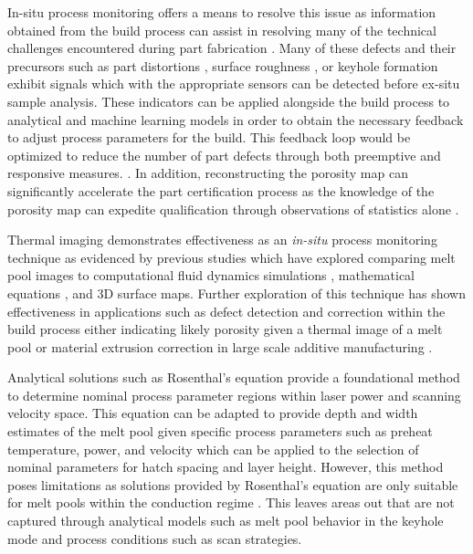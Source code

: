 In-situ process monitoring offers a means to resolve this issue as information
obtained from the build process can assist in resolving many of the technical
challenges encountered during part fabrication \cite{slotwinski_porosity_2014,
tian_roadmap_2022}. Many of these defects and their precursors such as part
distortions \cite{biegler_-situ_2018}, surface roughness
\cite{hofman_situ_2022}, or keyhole formation \cite{ren_machine_2023,
tempelman_detection_2022} exhibit signals which with the appropriate sensors can
be detected before ex-situ sample analysis. These indicators can be applied
alongside the build process to analytical and machine learning models in order
to obtain the necessary feedback to adjust process parameters for the build.
This feedback loop would be optimized to reduce the number of part defects
through both preemptive and responsive measures. \cite{mccann_-situ_2021,
feng_predicting_2022}. In addition, reconstructing the porosity map can
significantly accelerate the part certification process as the knowledge of the
porosity map can expedite qualification through observations of statistics alone
\cite{seifi_overview_2016, chen_review_2022, knapp_building_2017,
dordlofva_design_2020, sola_microstructural_2019}. 

Thermal imaging demonstrates effectiveness as an \textit{in-situ} process
monitoring technique as evidenced by previous studies which have explored
comparing melt pool images to computational fluid dynamics simulations
\cite{myers_high-resolution_2023}, mathematical equations
\cite{kayacan_investigation_2020}, and 3D surface maps\cite{haley_-situ_2021}.
Further exploration of this technique has shown effectiveness in applications
such as defect detection and correction within the build process either
indicating likely porosity given a thermal image of a melt pool
\cite{mitchell_linking_2020} or material extrusion correction in large scale
additive manufacturing \cite{borish_real-time_2020, borish_-situ_2019}.

Analytical solutions such as Rosenthal's equation \cite{rosenthal_theory_2022}
provide a foundational method to determine nominal process parameter regions
within laser power and scanning velocity space. This equation can be adapted to
provide depth and width estimates of the melt pool given specific process
parameters such as preheat temperature, power, and velocity which can be applied
to the selection of nominal parameters for hatch spacing and layer height.
However, this method poses limitations as solutions provided by Rosenthal's
equation are only suitable for melt pools within the conduction regime
\cite{rosenthal_theory_2022, hekmatjou_comparative_2020,
imani_shahabad_extended_2021}. This leaves areas out that are not captured
through analytical models such as melt pool behavior in the keyhole mode and
process conditions such as scan strategies.

